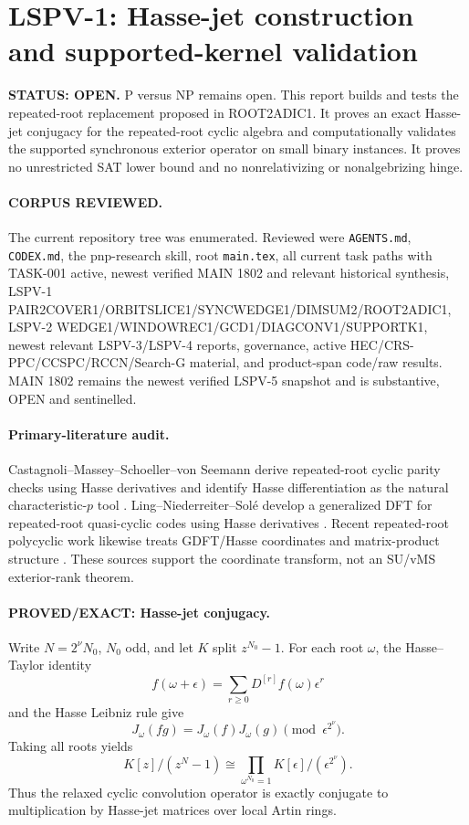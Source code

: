 \documentclass[11pt]{article}
\begin{document}
\section*{LSPV-1: Hasse-jet construction and supported-kernel validation}

\textbf{STATUS: OPEN.} P versus NP remains open. This report builds and tests the repeated-root replacement proposed in ROOT2ADIC1. It proves an exact Hasse-jet conjugacy for the repeated-root cyclic algebra and computationally validates the supported synchronous exterior operator on small binary instances. It proves no unrestricted SAT lower bound and no nonrelativizing or nonalgebrizing hinge.

\paragraph{CORPUS REVIEWED.}
The current repository tree was enumerated. Reviewed were \texttt{AGENTS.md}, \texttt{CODEX.md}, the pnp-research skill, root \texttt{main.tex}, all current task paths with TASK-001 active, newest verified MAIN 1802 and relevant historical synthesis, LSPV-1 PAIR2COVER1/ORBITSLICE1/SYNCWEDGE1/DIMSUM2/ROOT2ADIC1, LSPV-2 WEDGE1/WINDOWREC1/GCD1/DIAGCONV1/SUPPORTK1, newest relevant LSPV-3/LSPV-4 reports, governance, active HEC/CRS-PPC/CCSPC/RCCN/Search-G material, and product-span code/raw results. MAIN 1802 remains the newest verified LSPV-5 snapshot and is substantive, OPEN and sentinelled.

\paragraph{Primary-literature audit.}
Castagnoli--Massey--Schoeller--von Seemann derive repeated-root cyclic parity checks using Hasse derivatives and identify Hasse differentiation as the natural characteristic-\(p\) tool \cite{Castagnoli}. Ling--Niederreiter--Sol\'e develop a generalized DFT for repeated-root quasi-cyclic codes using Hasse derivatives \cite{Ling}. Recent repeated-root polycyclic work likewise treats GDFT/Hasse coordinates and matrix-product structure \cite{Bajalan}. These sources support the coordinate transform, not an SU/vMS exterior-rank theorem.

\paragraph{PROVED/EXACT: Hasse-jet conjugacy.}
Write \(N=2^\nu N_0\), \(N_0\) odd, and let \(K\) split \(z^{N_0}-1\). For each root \(\omega\), the Hasse--Taylor identity
\[
f(\omega+\epsilon)=\sum_{r\ge0}D^{[r]}f(\omega)\epsilon^r
\]
and the Hasse Leibniz rule give
\[
\boxed{J_\omega(fg)=J_\omega(f)J_\omega(g)\pmod{\epsilon^{2^\nu}}.}
\]
Taking all roots yields
\[
\boxed{K[z]/(z^N-1)\cong\prod_{\omega^{N_0}=1}K[\epsilon]/(\epsilon^{2^\nu}).}
\]
Thus the relaxed cyclic convolution operator is exactly conjugate to multiplication by Hasse-jet matrices over local Artin rings.
\end{document}
